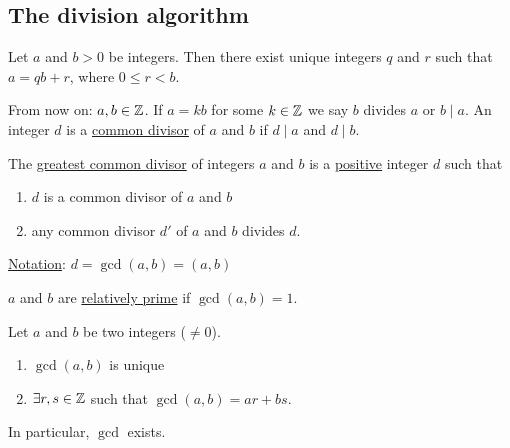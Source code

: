 \documentclass[]{article}
\begin{document}
\subsection{The division algorithm}
\begin{theorem}
	 Let $a$ and $b>0$ be integers. Then there exist unique integers $q$ and $r$ such that $a = qb +r$, where $0\leq r < b$.
\end{theorem}
From now on: $a,b\in\mathbb{Z}$. If $a =kb$ for some $k\in\mathbb{Z}$ we say $b$ divides $a$ or $b\mid a$. An integer $d$ is a \ul{common divisor} of $a$ and $b$ if $d\mid a$ and $d\mid b$.
\begin{definition}
	The \ul{greatest common divisor} of integers $a$ and $b$ is a \ul{positive} integer $d$ such that
	\begin{enumerate}
		\item $d$ is a common divisor of $a$ and $b$
		\item any common divisor $d'$ of $a$ and $b$ divides $d$.
	\end{enumerate}
	\ul{Notation}: $d = \gcd(a,b) = (a,b)$
\end{definition}
$a$ and $b$ are \ul{relatively prime} if $\gcd(a,b) = 1$.
\begin{theorem}
	Let $a$ and $b$ be two integers ($\neq 0$).
	\begin{enumerate}
		\item $\gcd(a,b)$ is unique
		\item $\exists r,s\in\mathbb{Z}$ such that $\gcd(a,b) = ar+bs$.
	\end{enumerate}
	In particular, $\gcd$ exists.
\end{theorem}
\end{document}

